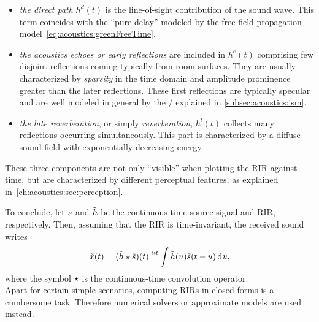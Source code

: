 \begin{itemize}
    \item \textit{the direct path} $h^d(t)$ is the line-of-sight contribution of the sound wave.
    This term coincides with the ``pure delay'' modeled by the free-field propagation model~\eqref{eq:acoustics:greenFreeTime}.

    \item \textit{the acoustics echoes or early reflections} are included in $h^e(t)$ comprising few disjoint reflections coming typically from room surfaces.
    They are usually characterized by \textit{sparsity} in the time domain and amplitude prominence greater than the later reflections.
    These first reflections are typically specular and are well modeled in general by the \ISMdef/ explained in \cref{subsec:acoustics:ism}.

    \item \textit{the late reverberation}, or simply \textit{reverberation}, $h^l(t)$ collects many reflections occurring simultaneously.
    This part is characterized by a diffuse sound field with exponentially decreasing energy.
\end{itemize}
These three components are not only ``visible'' when plotting the \ac{RIR} against time,
but are characterized by different perceptual features, as explained in~\cref{ch:acoustics:sec:perception}.

\mynewline
To conclude, let $\tilde{s}$ and $\tilde{h}$ be the continuous-time source signal and \ac{RIR}, respectively.
Then, assuming that the \ac{RIR} is time-invariant, the received sound writes
\begin{equation}
    \tilde{\mic}(t) = (\tilde{\rir} \convCont \tilde{\src})(t) \eqdef \int \tilde{\rir}(u) \tilde{\src}(t - u) \kdiff{u}
    ,
\end{equation}
where the symbol $\star$ is the continuous-time convolution operator.
\\Apart for certain simple scenarios, computing \acp{RIR} in closed forms is a cumbersome task.
Therefore numerical solvers or approximate models are used instead.


